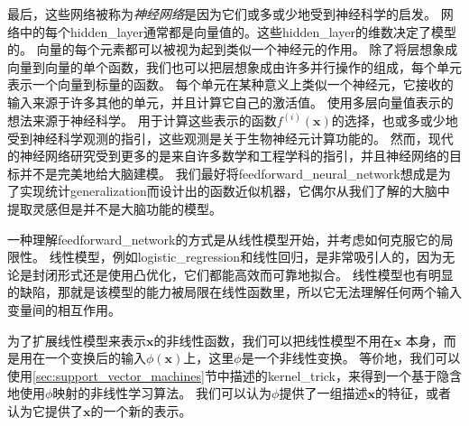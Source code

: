 
最后，这些网络被称为\emph{神经网络}是因为它们或多或少地受到神经科学的启发。
网络中的每个\gls{hidden_layer}通常都是向量值的。这些\gls{hidden_layer}的维数决定了模型的。
向量的每个元素都可以被视为起到类似一个神经元的作用。
除了将层想象成向量到向量的单个函数，我们也可以把层想象成由许多并行操作的组成，每个单元表示一个向量到标量的函数。
每个单元在某种意义上类似一个神经元，它接收的输入来源于许多其他的单元，并且计算它自己的激活值。
使用多层向量值表示的想法来源于神经科学。
用于计算这些表示的函数$f^{(i)}(\bm{x})$的选择，也或多或少地受到神经科学观测的指引，这些观测是关于生物神经元计算功能的。
然而，现代的神经网络研究受到更多的是来自许多数学和工程学科的指引，并且神经网络的目标并不是完美地给大脑建模。
我们最好将\gls{feedforward_neural_network}想成是为了实现统计\gls{generalization}而设计出的函数近似机器，它偶尔从我们了解的大脑中提取灵感但是并不是大脑功能的模型。

一种理解\gls{feedforward_network}的方式是从线性模型开始，并考虑如何克服它的局限性。
线性模型，例如\gls{logistic_regression}和线性回归，是非常吸引人的，因为无论是封闭形式还是使用凸优化，它们都能高效而可靠地拟合。
线性模型也有明显的缺陷，那就是该模型的能力被局限在线性函数里，所以它无法理解任何两个输入变量间的相互作用。

为了扩展线性模型来表示$\bm{x}$的非线性函数，我们可以把线性模型不用在$\bm{x}$ 本身，而是用在一个变换后的输入$\phi(\bm{x})$上，这里$\phi$是一个非线性变换。
等价地，我们可以使用\ref{sec:support_vector_machines}节中描述的\gls{kernel_trick}，来得到一个基于隐含地使用$\phi$映射的非线性学习算法。
我们可以认为$\phi$提供了一组描述$\bm{x}$的特征，或者认为它提供了$\bm{x}$的一个新的表示。



